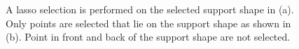 \begin{figure}[h]
\centering
{}
\caption{A lasso selection is performed on the selected support shape in (a). Only points are selected that lie on the support shape as shown in (b). Point in front and back of the support shape are not selected. }
\label{fig:technologiezentrum_lasso}
\end{figure}


